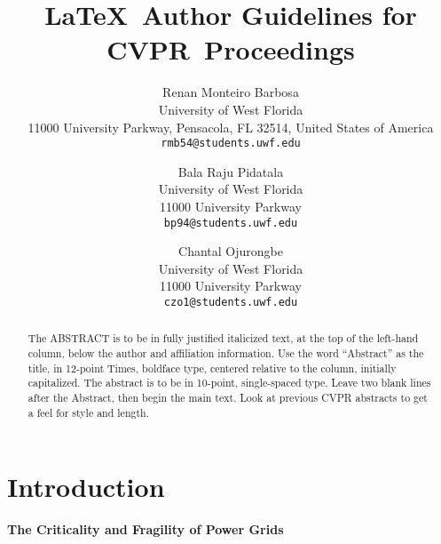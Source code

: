 \documentclass[10pt,twocolumn,letterpaper]{article}
\def\confName{CVPR}
\begin{document}
\title{\LaTeX\ Author Guidelines for \confName~Proceedings}

\author{Renan Monteiro Barbosa\\
University of West Florida\\
11000 University Parkway, Pensacola, FL 32514, United States of America \\
{\tt\small rmb54@students.uwf.edu}
\and
Bala Raju Pidatala\\
University of West Florida\\
11000 University Parkway\\
{\tt\small bp94@students.uwf.edu}
\and
Chantal Ojurongbe\\
University of West Florida\\
11000 University Parkway\\
{\tt\small czo1@students.uwf.edu}
}
\maketitle

\begin{abstract}
   The ABSTRACT is to be in fully justified italicized text, at the top of the left-hand column, below the author and affiliation information.
   Use the word ``Abstract'' as the title, in 12-point Times, boldface type, centered relative to the column, initially capitalized.
   The abstract is to be in 10-point, single-spaced type.
   Leave two blank lines after the Abstract, then begin the main text.
   Look at previous CVPR abstracts to get a feel for style and length.
\end{abstract}



\section{Introduction}
\label{sec:intro}

\textbf{The Criticality and Fragility of Power Grids}
\end{document}
